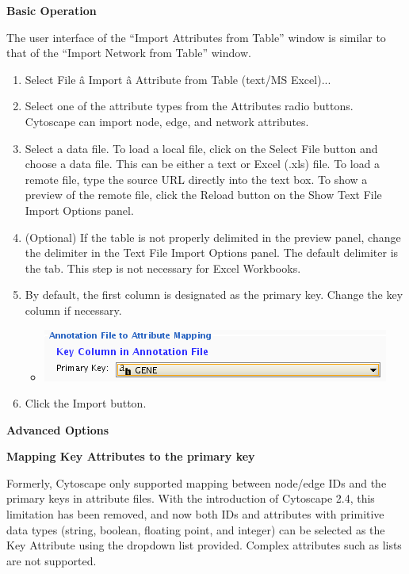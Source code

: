  \textbf{Basic Operation}


 The user interface of the ``Import Attributes from Table'' window is similar to that of the ``Import Network from Table'' window. 
\begin{enumerate}
\item 

 Select File \^a Import \^a Attribute from Table (text/MS Excel)... 

\item Select one of the attribute types from the Attributes radio buttons. Cytoscape can import node, edge, and network attributes. 
\item Select a data file. To load a local file, click on the Select File button and choose a data file. This can be either a text or Excel (.xls) file. To load a remote file, type the source URL directly into the text box. To show a preview of the remote file, click the Reload button on the Show Text File Import Options panel. 
\item (Optional) If the table is not properly delimited in the preview panel, change the delimiter in the Text File Import Options panel. The default delimiter is the tab. This step is not necessary for Excel Workbooks. 
\item By default, the first column is designated as the primary key. Change the key column if necessary. \begin{itemize}
\item 

 \includegraphics[width=\textwidth]{images/attribute_table_import_primary_key.png} 


\end{itemize}

\item Click the Import button. 

\end{enumerate}


 
\textbf{Advanced Options}


 \textbf{Mapping Key Attributes to the primary key}


 Formerly, Cytoscape only supported mapping between node/edge IDs and the primary keys in attribute files. With the introduction of Cytoscape 2.4, this limitation has been removed, and now both IDs and attributes with primitive data types (string, boolean, floating point, and integer) can be selected as the Key Attribute using the dropdown list provided. Complex attributes such as lists are not supported. 


